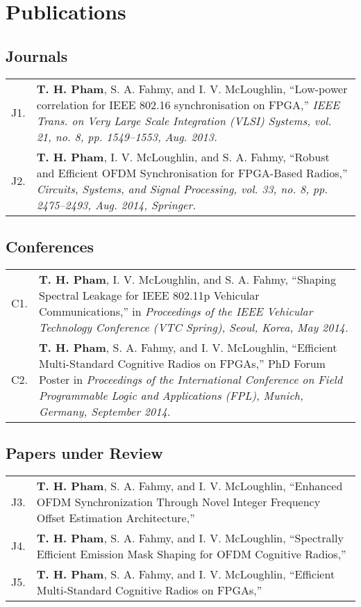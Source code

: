 \chapter* {Publications}

\section*{Journals}

\begin{tabular}{p{15pt}p{385pt}}
	J1. & {\bf T. H. Pham}, S. A. Fahmy, and I. V. McLoughlin, ``Low-power correlation for IEEE 802.16 synchronisation on FPGA,'' \textit{IEEE Trans. on Very Large Scale Integration (VLSI) Systems, vol. 21, no. 8, pp. 1549–1553, Aug. 2013.}\\
	J2. & {\bf T. H. Pham}, I. V. McLoughlin, and S. A. Fahmy, ``Robust and Efficient OFDM Synchronisation for FPGA-Based Radios,'' \textit{Circuits, Systems, and Signal Processing, vol. 33, no. 8, pp. 2475–2493, Aug. 2014, Springer.}\\
\end{tabular}
\section*{Conferences}

\begin{tabular}{p{15pt}p{385pt}}
	C1. & {\bf T. H. Pham}, I. V. McLoughlin, and S. A. Fahmy, ``Shaping Spectral Leakage for IEEE 802.11p Vehicular Communications,'' in \textit{Proceedings of the IEEE Vehicular Technology Conference (VTC Spring), Seoul, Korea, May 2014.}\\
	C2. & {\bf T. H. Pham}, S. A. Fahmy, and I. V. McLoughlin, ``Efficient Multi-Standard Cognitive Radios on FPGAs,'' PhD Forum Poster in \textit{Proceedings of the International Conference on Field Programmable Logic and Applications (FPL), Munich, Germany, September 2014.}\\
\end{tabular}

\section*{Papers under Review}

\begin{tabular}{p{15pt}p{385pt}}
	J3. & {\bf T. H. Pham}, S. A. Fahmy, and I. V. McLoughlin, ``Enhanced OFDM Synchronization Through Novel Integer Frequency Offset Estimation Architecture,'' \\
	J4. & {\bf T. H. Pham}, S. A. Fahmy, and I. V. McLoughlin, ``Spectrally Efficient Emission Mask Shaping for OFDM Cognitive Radios,'' \\
	J5. & {\bf T. H. Pham}, S. A. Fahmy, and I. V. McLoughlin, ``Efficient Multi-Standard Cognitive Radios on FPGAs,'' \\
\end{tabular}
